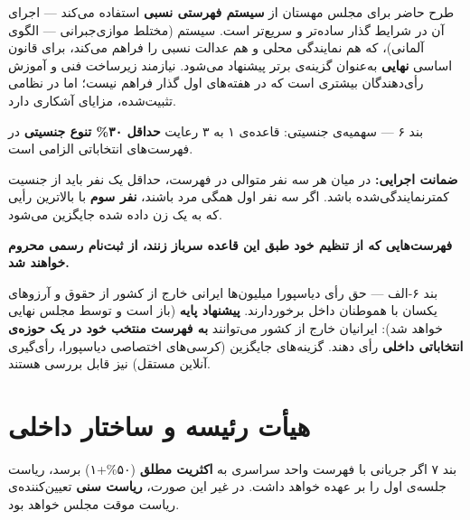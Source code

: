 \documentclass[12pt,a4paper,twoside,openany]{book}
\begin{document}
	\begin{notebox}[title={\rl{یادداشت درباره‌ی سیستم انتخاباتی (\lr{MMP} در برابر فهرستی نسبی)}}]
		طرح حاضر برای مجلس مهستان از \textbf{سیستم فهرستی نسبی} استفاده می‌کند --- اجرای
		آن در شرایط گذار ساده‌تر و سریع‌تر است. سیستم \textbf{} (مختلط
		موازی‌جبرانی --- الگوی آلمانی)، که هم نمایندگی محلی و هم عدالت نسبی را فراهم
		می‌کند، برای قانون اساسی \textbf{نهایی} به‌عنوان گزینه‌ی برتر پیشنهاد می‌شود.
		 نیازمند زیرساخت فنی و آموزش رأی‌دهندگان بیشتری است که در هفته‌های اول
		گذار فراهم نیست؛ اما در نظامی تثبیت‌شده، مزایای آشکاری دارد.
	\end{notebox}
	
	\begin{bandbox}{بند ۶ --- سهمیه‌ی جنسیتی: قاعده‌ی ۱ به ۳}
		رعایت \textbf{حداقل ۳۰\% تنوع جنسیتی} در فهرست‌های انتخاباتی الزامی است.
		
		\textbf{ضمانت اجرایی:} در میان هر سه نفر متوالی در فهرست، حداقل یک نفر باید از
		جنسیت کمتر‌نمایندگی‌شده باشد. اگر سه نفر اول همگی مرد باشند، \textbf{نفر سوم}
		با بالاترین رأیی که به یک زن داده شده جایگزین می‌شود.
		
		\textbf{فهرست‌هایی که از تنظیم خود طبق این قاعده سرباز زنند، از ثبت‌نام رسمی
			محروم خواهند شد.}
	\end{bandbox}
	
	\begin{bandbox}{بند ۶-الف --- حق رأی دیاسپورا}
		میلیون‌ها ایرانی خارج از کشور از حقوق و آرزوهای یکسان با هموطنان داخل برخوردارند.
		\textbf{پیشنهاد پایه} (باز است و توسط مجلس نهایی خواهد شد): ایرانیان خارج از کشور
		می‌توانند \textbf{به فهرست منتخب خود در یک حوزه‌ی انتخاباتی داخلی} رأی دهند.
		گزینه‌های جایگزین (کرسی‌های اختصاصی دیاسپورا، رأی‌گیری آنلاین مستقل) نیز قابل بررسی هستند.
	\end{bandbox}
	
	\section{هیأت رئیسه و ساختار داخلی}
	
	\begin{bandbox}{بند ۷}
		اگر جریانی با فهرست واحد سراسری به \textbf{اکثریت مطلق} (۵۰\%+۱) برسد، ریاست
		جلسه‌ی اول را بر عهده خواهد داشت. در غیر این صورت، \textbf{ریاست سنی}
		تعیین‌کننده‌ی ریاست موقت مجلس خواهد بود.
	\end{bandbox}
	
\end{document}
